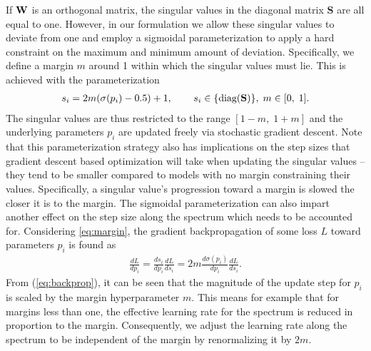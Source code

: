 \documentclass{article} %
\begin{document}
If $\bf{W}$ is an orthogonal matrix, the singular values in the diagonal matrix ${\mathbf{S}}$ are all equal to one. However, in our formulation we allow these singular values to deviate from one and employ a sigmoidal parameterization to apply a hard constraint on the maximum and minimum amount of deviation. Specifically, we define a margin ${\mathit{m}}$ around 1 within which the singular values must lie. This is achieved with the parameterization
%
\begin{equation}
\begin{gathered}
s_i = 2m(\sigma(p_i) - 0.5) + 1, \hspace{.2in} 
~~s_i \in \{\textrm{diag}(\mathbf{S})\} , \;
m \in \mathbb[0, \; 1].
\label{eq:margin}
\end{gathered}
\end{equation}
%
The singular values are thus restricted to the range ${\mathit{[\textrm{1}-m, \; \textrm{1}+m]}}$ and the underlying parameters ${\mathit{p_i}}$ are updated freely via stochastic gradient descent. 
Note that this parameterization strategy also has implications on the step sizes that gradient descent based optimization will take when updating the singular values -- they tend to be smaller compared to models with no margin constraining their values. Specifically, a singular value's progression toward a margin is slowed the closer it is to the margin. The sigmoidal parameterization can also impart another effect on the step size along the spectrum which needs to be accounted for. Considering \ref{eq:margin}, the gradient backpropagation of some loss ${\mathit{L}}$ toward parameters ${\mathit{p_i}}$ is found as
%
\begin{equation}
\begin{aligned}
\frac{dL}{dp_i} = \frac{ds_i}{dp_i} \frac{dL}{ds_i} = 2m \frac{d\sigma(p_i)}{dp_i} \frac{dL}{ds_i}.
\end{aligned}
\label{eq:backprop}
\end{equation}
%
From (\ref{eq:backprop}), it can be seen that the magnitude of the update step for ${\mathit{p_i}}$ is scaled by the margin hyperparameter ${\mathit{m}}$. This means for example that for margins less than one, the effective learning rate for the spectrum is reduced in proportion to the margin. Consequently, we adjust the learning rate along the spectrum to be independent of the margin by renormalizing it by ${\mathit{2m}}$. 
\end{document}
